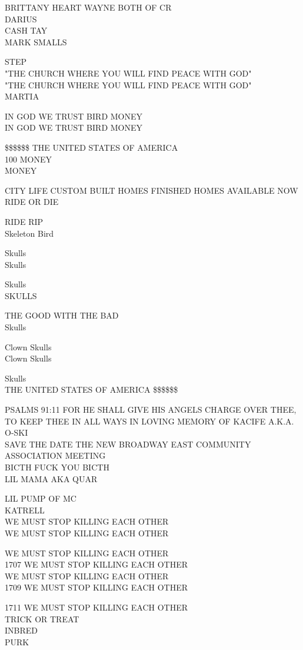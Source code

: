 \documentclass[10pt,letterpaper]{article}
\begin{document}
BRITTANY HEART WAYNE BOTH OF CR\\
DARIUS\\
CASH TAY\\
MARK SMALLS

STEP\\
"THE CHURCH WHERE YOU WILL FIND PEACE WITH GOD"\\
"THE CHURCH WHERE YOU WILL FIND PEACE WITH GOD"\\
MARTIA

IN GOD WE TRUST BIRD MONEY\\
IN GOD WE TRUST BIRD MONEY

\$\$\$\$\$\$ THE UNITED STATES OF AMERICA\\
100 MONEY\\
MONEY

CITY LIFE CUSTOM BUILT HOMES FINISHED HOMES AVAILABLE NOW\\
RIDE OR DIE

RIDE RIP\\
Skeleton Bird

Skulls\\
Skulls

Skulls\\
SKULLS

THE GOOD WITH THE BAD\\
Skulls

Clown Skulls\\
Clown Skulls

Skulls\\
THE UNITED STATES OF AMERICA \$\$\$\$\$\$

PSALMS 91:11 FOR HE SHALL GIVE HIS ANGELS CHARGE OVER THEE, TO KEEP THEE IN ALL WAYS IN LOVING MEMORY OF KACIFE A.K.A. O{-}SKI\\
SAVE THE DATE THE NEW BROADWAY EAST COMMUNITY ASSOCIATION MEETING\\
BICTH FUCK YOU BICTH\\
LIL MAMA AKA QUAR

LIL PUMP OF MC\\
KATRELL\\
WE MUST STOP KILLING EACH OTHER\\
WE MUST STOP KILLING EACH OTHER

WE MUST STOP KILLING EACH OTHER\\
1707 WE MUST STOP KILLING EACH OTHER\\
WE MUST STOP KILLING EACH OTHER\\
1709 WE MUST STOP KILLING EACH OTHER

1711 WE MUST STOP KILLING EACH OTHER\\
TRICK OR TREAT\\
INBRED\\
PURK
\end{document}
